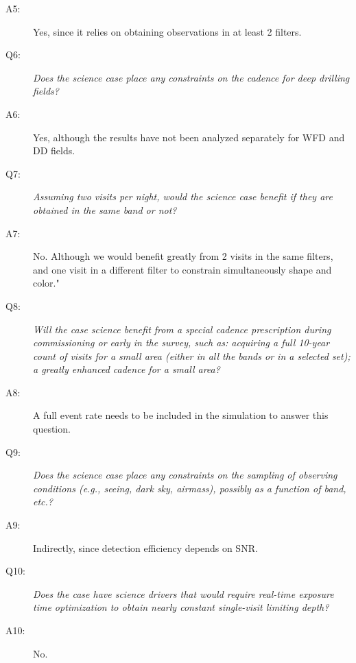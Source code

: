 \begin{description}
 \item[A5:] Yes, since it relies on obtaining observations in at least 2 filters.


 \item[Q6:] {\it Does the science case place any constraints on the
 cadence for deep drilling fields?}

 \item[A6:] Yes, although the results have not been analyzed separately for WFD and DD fields.


 \item[Q7:] {\it Assuming two visits per night, would the science case
 benefit if they are obtained in the same band or not?}

 \item[A7:] No. Although  we would benefit greatly from 2 visits in the same filters, and one visit in a different filter to constrain simultaneously shape and color."


 \item[Q8:] {\it Will the case science benefit from a special cadence
 prescription during commissioning or early in the survey, such as:
 acquiring a full 10-year count of visits for a small area (either in
 all the bands or in a  selected set); a greatly enhanced cadence for a
 small area?}

 \item[A8:] A full event rate needs to be included in the simulation to answer this question.


 \item[Q9:] {\it Does the science case place any constraints on the
 sampling of observing conditions (e.g., seeing, dark sky, airmass),
 possibly as a function of band, etc.?}

 \item[A9:] Indirectly, since detection efficiency depends on SNR.


 \item[Q10:] {\it Does the case have science drivers that would require
 real-time exposure time optimization to obtain nearly constant
 single-visit limiting depth?}

 \item[A10:] No.

 \end{description}

 \navigationbar
